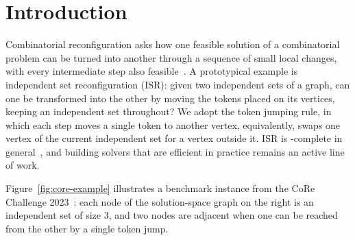 \documentclass[conference]{IEEEtran}
\newcommand{\ISR}{\textsc{ISR}\xspace}
\begin{document}
\section{Introduction}
Combinatorial reconfiguration asks how one feasible solution of a combinatorial
problem can be turned into another through a sequence of small local changes, with
every intermediate step also feasible~\cite{nishimura18}. A prototypical example
is independent set reconfiguration (\ISR): given two independent sets of a graph,
can one be transformed into the other by moving the tokens placed on its vertices,
keeping an independent set throughout? We adopt the token jumping rule, in which
each step moves a single token to another vertex, equivalently, swaps one vertex
of the current independent set for a vertex outside it. \ISR is \PSPACE-complete in
general~\cite{kamemi12,itdehapasiueun11}, and building solvers that are efficient
in practice remains an active line of work.

Figure~\ref{fig:core-example} illustrates a benchmark instance from the CoRe
Challenge 2023~\cite{sotaokit24}: each node of the solution-space graph on the
right is an independent set of size $3$, and two nodes are adjacent when one can
be reached from the other by a single token jump.
\end{document}
